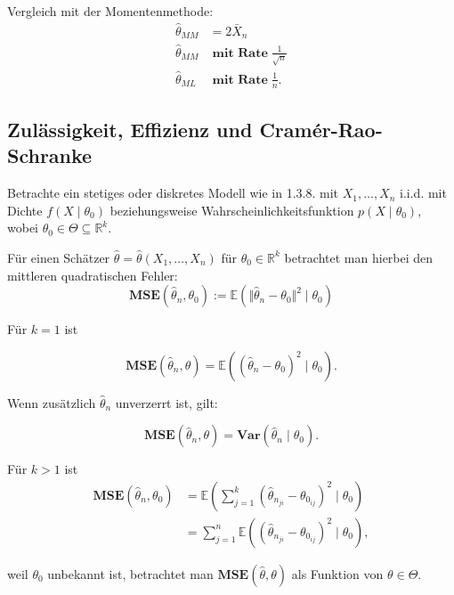 \documentclass[10pt]{article}
\newcommand{\FZV}{X_1, \ldots, X_n} %
\newcommand{\IR}{\mathbb{R}} %
\newcommand{\EW}{\mathbb{E}} %
\newcommand{\MSE}{\textbf{MSE}} %
\newenvironment{BSP}[1][]
{\begin{Beispiel}[frametitle=#1]}{\end{Beispiel}}
\begin{document}
\begin{BSP}[Beispiel 1.3.11 (Grenzverteilung keine Normalverteilung)]
		Vergleich mit der Momentenmethode:
		\begin{equation*}
			\begin{split}
				\hat{\theta}_{MM}& = 2 \bar{X}_n\\
				\hat{\theta}_{MM}& \; \textbf{mit Rate} \;\frac{1}{\sqrt{n}}\\
				\hat{\theta}_{ML}& \; \textbf{mit Rate} \;\frac{1}{n}.
			\end{split}
		\end{equation*}
	\end{BSP}
	
	\subsection{Zulässigkeit, Effizienz und Cramér-Rao-Schranke}
	
	Betrachte ein stetiges oder diskretes Modell wie in 1.3.8. mit $\FZV$ i.i.d. mit Dichte $f(X\mid \theta_0)$ beziehungsweise Wahrscheinlichkeitsfunktion $p(X \mid \theta_0)$, wobei $\theta_0 \in \Theta \subseteq \IR^k$. 
	
	Für einen Schätzer $\hat{\theta} = \hat{\theta}(X_1, \ldots, X_n)$ für $\theta_0 \in \IR^k$ betrachtet man hierbei den mittleren quadratischen Fehler:
	\begin{equation*}
		\textbf{MSE}(\hat{\theta}_n, \theta_0) := \EW (\Vert {\hat{\theta}_n-\theta_0}\Vert ^2 \mid \theta_0)
	\end{equation*}
	
	\begin{Bemerkung}[Bemerkung ]
		 Für $k = 1$ ist 
		
		\begin{equation*}
			\textbf{MSE} (\hat{\theta}_n, \theta) = \EW (( {\hat{\theta}_n-\theta_0} )^2 \mid \theta_0).
		\end{equation*}
		
		Wenn zusätzlich 	$\hat{\theta}_n$ unverzerrt ist, gilt: 
		
		\begin{equation*}
			\textbf{MSE} (\hat{\theta}_n, \theta) =  \textbf{Var}(\hat{\theta}_n \mid \theta_0).
		\end{equation*}
		
		Für $k>1$ ist 
		\begin{equation*}
			\begin{split}
				\MSE(\hat{\theta}_n, \theta_0) &= \EW(\sum_{j=1}^{k}(\hat{\theta}_{n_{ji}} - \theta_{0_{ij}})^2 \mid \theta_0 )\\
				&= \sum_{j=1}^{n} \EW ((\hat{\theta}_{n_{ji}} - \theta_{0_{ij}})^2 \mid \theta_0),
			\end{split}
		\end{equation*}
		
		weil $\theta_0$ unbekannt ist, betrachtet man $\MSE(\hat{\theta}, \theta)$ als Funktion von $\theta \in \Theta$.
	\end{Bemerkung}
	
\end{document}
